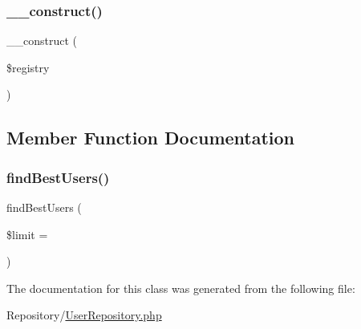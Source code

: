 \subsubsection{\texorpdfstring{\_\_construct()}{\_\_construct()}}
{\footnotesize\ttfamily \+\_\+\+\_\+construct (\begin{DoxyParamCaption}\item[{Registry\+Interface}]{\$registry }\end{DoxyParamCaption})}



\subsection{Member Function Documentation}
\mbox{\label{class_app_1_1_repository_1_1_user_repository_a9c9ef88d4f15cf36b3dcc8299dd25461}} 
\subsubsection{\texorpdfstring{findBestUsers()}{findBestUsers()}}
{\footnotesize\ttfamily find\+Best\+Users (\begin{DoxyParamCaption}\item[{}]{\$limit = {} }\end{DoxyParamCaption})}



The documentation for this class was generated from the following file\+:\begin{DoxyCompactItemize}
\item 
Repository/\mbox{\hyperlink{_user_repository_8php}{User\+Repository.\+php}}\end{DoxyCompactItemize}
